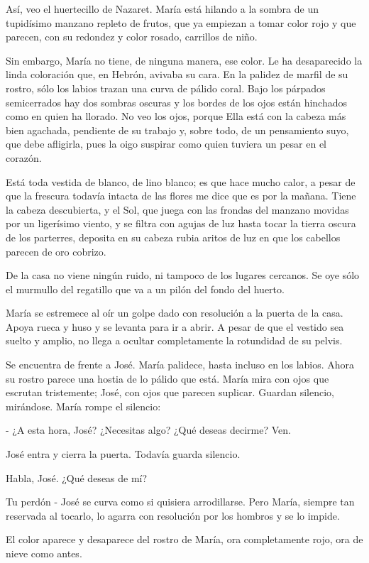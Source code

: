 \documentclass[12pt]{book} %
\begin{document}
Así, veo el huertecillo de Nazaret. María está hilando a la sombra de un tupidísimo manzano repleto de frutos, que ya empiezan a tomar color rojo y que parecen, con su redondez y color rosado, carrillos de niño. 

Sin embargo, María no tiene, de ninguna manera, ese color. Le ha desaparecido la linda coloración que, en Hebrón, avivaba su cara. En la palidez de marfil de su rostro, sólo los labios trazan una curva de pálido coral. Bajo los párpados semicerrados hay dos sombras oscuras y los bordes de los ojos están hinchados como en quien ha llorado. No veo los ojos, porque Ella está con la cabeza más bien agachada, pendiente de su trabajo y, sobre todo, de un pensamiento suyo, que debe afligirla, pues la oigo suspirar como quien tuviera un pesar en el corazón.

Está toda vestida de blanco, de lino blanco; es que hace mucho calor, a pesar de que la frescura todavía intacta de las flores me dice que es por la mañana. Tiene la cabeza descubierta, y el Sol, que juega con las frondas del manzano movidas por un ligerísimo viento, y se filtra con agujas de luz hasta tocar la tierra oscura de los parterres, deposita en su cabeza rubia aritos de luz en que los cabellos parecen de oro cobrizo. 

De la casa no viene ningún ruido, ni tampoco de los lugares cercanos. Se oye sólo el murmullo del regatillo que va a un pilón del fondo del huerto. 

María se estremece al oír un golpe dado con resolución a la puerta de la casa. Apoya rueca y huso y se levanta para ir a abrir. A pesar de que el vestido sea suelto y amplio, no llega a ocultar completamente la rotundidad de su pelvis. 

Se encuentra de frente a José. María palidece, hasta incluso en los labios. Ahora su rostro parece una hostia de lo pálido que está. María mira con ojos que escrutan tristemente; José, con ojos que parecen suplicar. Guardan silencio, mirándose. María rompe el silencio: 

- ¿A esta hora, José? ¿Necesitas algo? ¿Qué deseas decirme? Ven. 

José entra y cierra la puerta. Todavía guarda silencio. 

Habla, José. ¿Qué deseas de mí? 

Tu perdón - José se curva como si quisiera arrodillarse. Pero María, siempre tan reservada al tocarlo, lo agarra con resolución por los hombros y se lo impide. 

El color aparece y desaparece del rostro de María, ora completamente rojo, ora de nieve como antes. 
\end{document}
